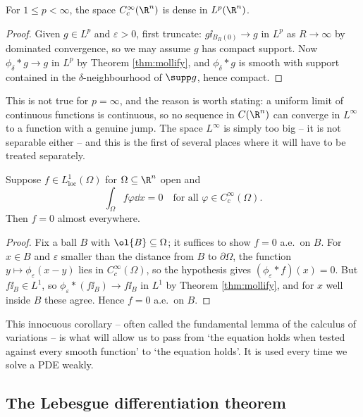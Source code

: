\begin{corollary}\label{cor:ccinftydense}
	For $1 \le p < \infty$, the space $C_c^\infty(\R^n)$ is dense in $L^p(\R^n)$.
\end{corollary}

\begin{proof}
	Given $g \in L^p$ and $\varepsilon > 0$, first truncate: $g \ii_{B_R(0)} \to g$ in $L^p$ as $R \to \infty$ by dominated convergence, so we may assume $g$ has compact support. Now $\phi_\delta * g \to g$ in $L^p$ by Theorem \ref{thm:mollify}, and $\phi_\delta * g$ is smooth with support contained in the $\delta$-neighbourhood of $\supp g$, hence compact.
\end{proof}

This is not true for $p = \infty$, and the reason is worth stating: a uniform limit of continuous functions is continuous, so no sequence in $C(\R^n)$ can converge in $L^\infty$ to a function with a genuine jump. The space $L^\infty$ is simply too big -- it is not separable either -- and this is the first of several places where it will have to be treated separately.

\begin{corollary}\label{cor:duboisreymond}
	Suppose $f \in L^1_{\mathrm{loc}}(\Omega)$ for $\Omega \subseteq \R^n$ open and
	$$\int_\Omega f \varphi \dd x = 0 \quad \text{for all } \varphi \in C_c^\infty(\Omega).$$
	Then $f = 0$ almost everywhere.
\end{corollary}

\begin{proof}
	Fix a ball $B$ with $\ol{B} \subseteq \Omega$; it suffices to show $f = 0$ a.e.\ on $B$. For $x \in B$ and $\varepsilon$ smaller than the distance from $B$ to $\partial \Omega$, the function $y \mapsto \phi_\varepsilon(x - y)$ lies in $C_c^\infty(\Omega)$, so the hypothesis gives $(\phi_\varepsilon * f)(x) = 0$. But $f \ii_B \in L^1$, so $\phi_\varepsilon * (f \ii_B) \to f\ii_B$ in $L^1$ by Theorem \ref{thm:mollify}, and for $x$ well inside $B$ these agree. Hence $f = 0$ a.e.\ on $B$.
\end{proof}

This innocuous corollary -- often called the fundamental lemma of the calculus of variations -- is what will allow us to pass from `the equation holds when tested against every smooth function' to `the equation holds'. It is used every time we solve a PDE weakly.

\subsection{The Lebesgue differentiation theorem}

